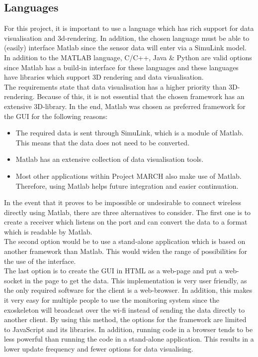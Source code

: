 \subsection{Languages}
For this project, it is important to use a language which has rich support for data visualisation and 3d-rendering. In addition, the chosen language must be able to (easily) interface Matlab since the sensor data will enter via a SimuLink model. In addition to the MATLAB language, C/C++, Java \& Python are valid options since Matlab has a build-in interface for these languages and these languages have libraries which support 3D rendering and data visualisation.\\ 


The requirements state that data visualisation has a higher priority than 3D-rendering. Because of this, it is not essential that the chosen framework has an extensive 3D-library. In the end, Matlab was chosen as preferred framework for the GUI for the following reasons:
\begin{itemize}
	\item The required data is sent through SimuLink, which is a module of Matlab. This means that the data does not need to be converted.
	\item Matlab has an extensive collection of data visualisation tools.
	\item Most other applications within Project MARCH also make use of Matlab. Therefore, using Matlab helps future integration and easier continuation.
\end{itemize}
In the event that it proves to be impossible or undesirable to connect wireless directly using Matlab, there are three alternatives to consider. The first one is to create a receiver which listens on the port and can convert the data to a format which is readable by Matlab.
\\The second option would be to use a stand-alone application which is based on another framework than Matlab. This would widen the range of possibilities for the use of the interface.
\\The last option is to create the GUI in HTML as a web-page and put a web-socket in the page to get the data. This implementation is very user friendly, as the only required software for the client is a web-browser. In addition, this makes it very easy for multiple people to use the monitoring system since the exoskeleton will broadcast over the wi-fi instead of sending the data directly to another client. By using this method, the options for the framework are limited to JavaScript and its libraries. In addition, running code in a browser tends to be less powerful than running the code in a stand-alone application. This results in a lower update frequency and fewer options for data visualising.


